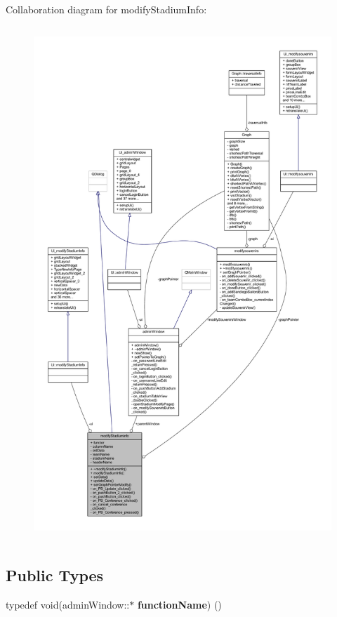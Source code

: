 Collaboration diagram for modify\+Stadium\+Info\+:
\nopagebreak
\begin{figure}[H]
\begin{center}
\leavevmode
\includegraphics[height=550pt]{classmodify_stadium_info__coll__graph}
\end{center}
\end{figure}
\subsection*{Public Types}
\begin{DoxyCompactItemize}
\item 
\mbox{\label{classmodify_stadium_info_aa54c08275884b7295007eff22fa722cc}} 
typedef void(admin\+Window\+::$\ast$ {\bfseries function\+Name}) ()
\end{DoxyCompactItemize}
